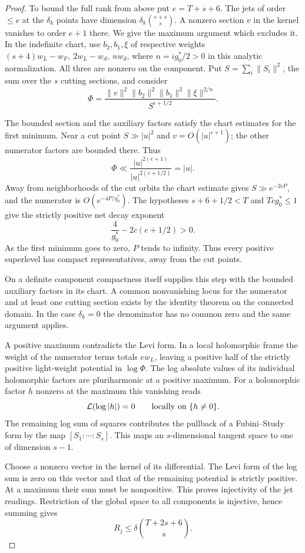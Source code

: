 \begin{proof}
To bound the full rank from above put \(e=T+s+6\).
The jets of order \(\le e\) at the \(\delta_k\) points have
dimension \(\delta_k\binom{e+s}{s}\). A nonzero section
\(v\) in the kernel vanishes to order \(e+1\) there.
We give the maximum argument which excludes it. In the
indefinite chart, use \(b_2,b_1,\xi\) of respective weights
\((s+4)w_L-w_F,\ 2w_L-w_d,\ n w_d\), where
\(n=i g_0^*/2>0\) in this analytic normalization.
All three are nonzero on the component. Put \(S=\sum_i
\|S_i\|^2\), the sum over the \(s\) cutting sections,
and consider
\[
 \Phi=\frac{\|v\|^2\|b_2\|^2\|b_1\|^2
                     \|\xi\|^{2/n}}{S^{e+1/2}} .
\]

The bounded section and the auxiliary factors satisfy the
chart estimates for the first minimum. Near a cut point \(S\gg|u|^2\) and \(v=O(|u|^{e+1})\);
the other numerator factors are bounded there. Thus
\[
 \Phi\ll \frac{|u|^{2(e+1)}}{|u|^{2(e+1/2)}}=|u|.
\] Away from neighborhoods of the cut
orbits the chart estimate gives \(S\gg e^{-2cP}\), and the
numerator is \(O(e^{-4P/g_0^*})\). The hypotheses \(s+6+1/2<T\) and \(Tcg_0^*\le1\) give the strictly positive net decay exponent
\[
  \frac{4}{g_0^*}-2c(e+1/2)>0.
\]
 As the first minimum
goes to zero, \(P\) tends to infinity. Thus every positive
superlevel has compact representatives, away from the cut
points.

On a definite component compactness itself supplies
this step with the bounded auxiliary factors in its chart.
A common nonvanishing locus for the numerator and at
least one cutting section exists by the identity theorem
on the connected domain. In the case \(\delta_k=0\) the
denominator has no common zero and the same argument applies.

A positive maximum contradicts the Levi form. In a local
holomorphic frame the weight of the numerator terms totals
\(e w_L\), leaving a positive half of the strictly positive
light-weight potential in \(\log\Phi\). The log absolute
values of its individual holomorphic factors are
pluriharmonic at a positive maximum.
For a holomorphic factor \(h\) nonzero at the maximum this vanishing reads
\[
  {\cal L}(\log|h|)=0\qquad\text{locally on }\{h\ne0\}.
\]
 The remaining log
sum of squares contributes the pullback of a
Fubini--Study form by the map \([S_1:\cdots:S_s]\).
This maps an \(s\)-dimensional tangent space to one of
dimension \(s-1\).

Choose a nonzero vector in the kernel
of its differential. The Levi form of the log sum is zero
on this vector and that of the remaining potential is
strictly positive. At a maximum their sum must be
nonpositive. This proves injectivity of the jet readings.
Restriction of the global space to all components is
injective, hence summing gives
\[
                      R_j\le\delta\binom{T+2s+6}{s}.
\]


\end{proof}

